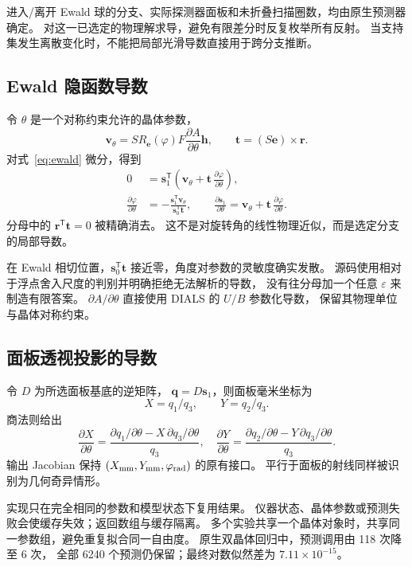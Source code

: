 \documentclass[UTF8,11pt,a4paper,fontset=fandol]{ctexart}
\newcommand{\T}{^{\mathsf T}}
\begin{document}
进入/离开 Ewald 球的分支、实际探测器面板和未折叠扫描圈数，均由原生预测器确定。
对这一已选定的物理解求导，避免有限差分时反复枚举所有反射。
当支持集发生离散变化时，不能把局部光滑导数直接用于跨分支推断。

\subsection{Ewald 隐函数导数}

令 $\theta$ 是一个对称约束允许的晶体参数，
\begin{equation}
\bm v_\theta=S R_{\bm e}(\varphi)F
 \frac{\partial A}{\partial\theta}\bm h,\qquad
\bm t=(S\bm e)\times\bm r .
\end{equation}
对式~\eqref{eq:ewald} 微分，得到
\begin{align}
0&=\bm s_1\T\left(\bm v_\theta+
               \bm t\,\frac{\partial\varphi}{\partial\theta}\right),\\
\frac{\partial\varphi}{\partial\theta}
 &=-\frac{\bm s_1\T\bm v_\theta}{\bm s_0\T\bm t},\qquad
\frac{\partial\bm s_1}{\partial\theta}
 =\bm v_\theta+\bm t\,\frac{\partial\varphi}{\partial\theta}.
\label{eq:rotationderiv}
\end{align}
分母中的 $\bm r\T\bm t=0$ 被精确消去。
这不是对旋转角的线性物理近似，而是选定分支的局部导数。

在 Ewald 相切位置，$\bm s_0\T\bm t$ 接近零，角度对参数的灵敏度确实发散。
源码使用相对于浮点舍入尺度的判别并明确拒绝无法解析的导数，
没有往分母加一个任意 $\varepsilon$ 来制造有限答案。
$\partial A/\partial\theta$ 直接使用 DIALS 的 $U/B$ 参数化导数，
保留其物理单位与晶体对称约束。

\subsection{面板透视投影的导数}

令 $D$ 为所选面板基底的逆矩阵，
$\bm q=D\bm s_1$，则面板毫米坐标为
\[
X=q_1/q_3,\qquad Y=q_2/q_3 .
\]
商法则给出
\begin{equation}
\frac{\partial X}{\partial\theta}
 =\frac{\partial q_1/\partial\theta-X\,\partial q_3/\partial\theta}{q_3},
\quad
\frac{\partial Y}{\partial\theta}
 =\frac{\partial q_2/\partial\theta-Y\,\partial q_3/\partial\theta}{q_3}.
\end{equation}
输出 Jacobian 保持 $(X_{\rm mm},Y_{\rm mm},\varphi_{\rm rad})$ 的原有接口。
平行于面板的射线同样被识别为几何奇异情形。

实现只在完全相同的参数和模型状态下复用结果。
仪器状态、晶体参数或预测失败会使缓存失效；返回数组与缓存隔离。
多个实验共享一个晶体对象时，共享同一参数组，避免重复拟合同一自由度。
原生双晶体回归中，预测调用由 118 次降至 6 次，
全部 6240 个预测仍保留；最终对数似然差为 $7.11\times10^{-15}$。
\end{document}
